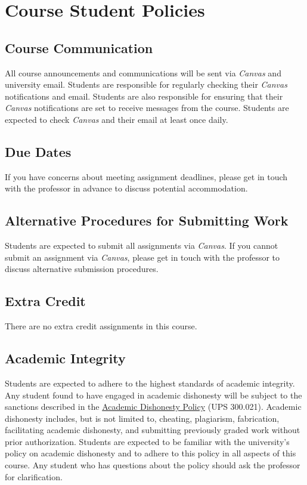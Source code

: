 \documentclass[12pt, letterpaper]{article}
\begin{document}
\section{Course Student Policies}

\subsection*{Course Communication}
All course announcements and communications will be sent via \emph{Canvas} and university email. Students are responsible for regularly checking their \emph{Canvas} notifications and email. Students are also responsible for ensuring that their \emph{Canvas} notifications are set to receive messages from the course. Students are expected to check \emph{Canvas} and their email at least once daily.

\subsection*{Due Dates}
If you have concerns about meeting assignment deadlines, please get in touch with the professor in advance to discuss potential accommodation.

\subsection*{Alternative Procedures for Submitting Work}
Students are expected to submit all assignments via \emph{Canvas}. If you cannot submit an assignment via \emph{Canvas}, please get in touch with the professor to discuss alternative submission procedures.

\subsection*{Extra Credit}
There are no extra credit assignments in this course. 

\subsection*{Academic Integrity}
Students are expected to adhere to the highest standards of academic integrity. Any student found to have engaged in academic dishonesty will be subject to the sanctions described in the \href{https://www.fullerton.edu/senate/publications_policies_resolutions/ups/UPS%20300/UPS%20300.021.pdf}{Academic Dishonesty Policy} (UPS 300.021). Academic dishonesty includes, but is not limited to, cheating, plagiarism, fabrication, facilitating academic dishonesty, and submitting previously graded work without prior authorization. Students are expected to be familiar with the university's policy on academic dishonesty and to adhere to this policy in all aspects of this course. Any student who has questions about the policy should ask the professor for clarification.
\end{document}
